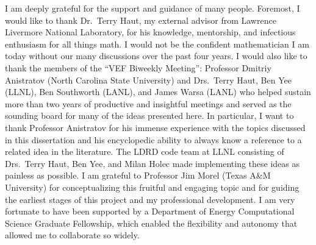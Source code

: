 \documentclass[../doc.tex]{subfiles}
\begin{document}
I am deeply grateful for the support and guidance of many people. Foremost, I would like to thank Dr.~Terry Haut, my external advisor from Lawrence Livermore National Laboratory, for his knowledge, mentorship, and infectious enthusiasm for all things math. I would not be the confident mathematician I am today without our many discussions over the past four years. 
I would also like to thank the members of the ``VEF Biweekly Meeting'': Professor Dmitriy Anistratov (North Carolina State University) and Drs.~Terry Haut, Ben Yee (LLNL), Ben Southworth (LANL), and James Warsa (LANL) who helped sustain more than two years of productive and insightful meetings and served as the sounding board for many of the ideas presented here. In particular, I want to thank Professor Anistratov for his immense experience with the topics discussed in this dissertation and his encyclopedic ability to always know a reference to a related idea in the literature. 
The LDRD code team at LLNL consisting of Drs.~Terry Haut, Ben Yee, and Milan Holec made implementing these ideas as painless as possible. 
I am grateful to Professor Jim Morel (Texas A\&M University) for conceptualizing this fruitful and engaging topic and for guiding the earliest stages of this project and my professional development. 
I am very fortunate to have been supported by a Department of Energy Computational Science Graduate Fellowship, which enabled the flexibility and autonomy that allowed me to collaborate so widely. 
\end{document}
